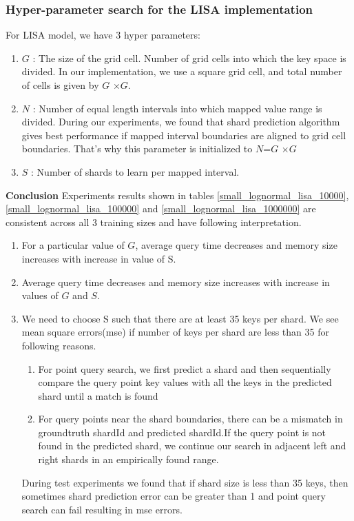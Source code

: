 \subsubsection {Hyper-parameter search for the LISA implementation}
For LISA model, we have 3 hyper parameters:
\begin{enumerate}
	\item $G$ : The size of the grid cell. Number of grid cells into which the key space is divided. In our implementation, we use a square grid cell, and total number of cells is given by $G$ $\times G$.
	\item $N$ : Number of equal length intervals into which mapped value range is divided. During our experiments, we found that shard prediction algorithm gives best performance if mapped interval boundaries are aligned to grid cell boundaries. That's why this parameter is initialized to $N$=$G$ $\times G$   
	\item $S$ : Number of shards to learn per mapped interval. 
\end{enumerate}

\textbf{Conclusion} Experiments results shown in tables \ref{small_lognormal_lisa_10000}, \ref{small_lognormal_lisa_100000} and \ref{small_lognormal_lisa_1000000} are consistent across all 3 training sizes and have following interpretation. 
\begin{enumerate}

    \item For a particular value of $G$, average query time decreases and memory size increases with increase in value of S.
    
    \item Average query time decreases and memory size increases with increase in values of $G$ and $S$. 
	
	\item We need to choose S such that there are at least 35 keys per shard. We see mean square errors(mse) if number of keys per shard are less than 35 for following reasons. 
	\begin{enumerate}
	    \item For point query search, we first predict a shard and then sequentially compare the query point key values with all the keys in the predicted shard until a match is found
		\item For query points near the shard boundaries, there can be a mismatch in groundtruth shardId and predicted shardId.If the query point is not found in the predicted shard, we continue our search in adjacent left and right shards in an empirically found range.
	\end{enumerate}
	
	During test experiments we found that if shard size is less than 35 keys, then sometimes shard prediction error can be greater than 1 and point query search can fail resulting in mse errors.  
\end{enumerate}

